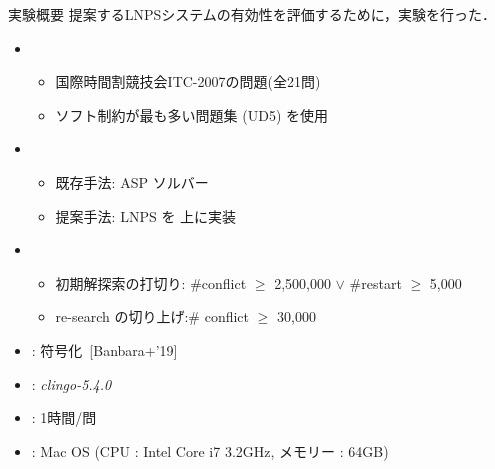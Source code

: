\documentclass[11pt,dvipdfmx]{beamer}
\begin{document}
\begin{frame}{実験概要}
  提案するLNPSシステムの有効性を評価するために，実験を行った．
  \bigskip
  \begin{itemize}
  \item {}
    \begin{itemize}
    \item 国際時間割競技会ITC-2007の問題(全21問)
    \item ソフト制約が最も多い問題集 (UD5) を使用
    \end{itemize}
  \item {}
    \begin{itemize}
    \item 既存手法: ASP ソルバー{\clingo}
    \item 提案手法: LNPS を{\clingo} 上に実装
    \end{itemize}
   \item {}
    \begin{itemize}
    \item 初期解探索の打切り:
      \#conflict $\geq$ 2,500,000 $\lor$ \#restart $\geq$ 5,000
     \item re-search の切り上げ:\# conflict $\geq$ 30,000
    \end{itemize}
  \item {}: {\teaspoon} 符号化~[Banbara+'19]
  \item {}: \textit{clingo-5.4.0}
  \item {}: 1時間/問
  \item {}: Mac OS (CPU : Intel Core i7 3.2GHz, メモリー : 64GB) 
  \end{itemize}
\end{frame}
\end{document}
